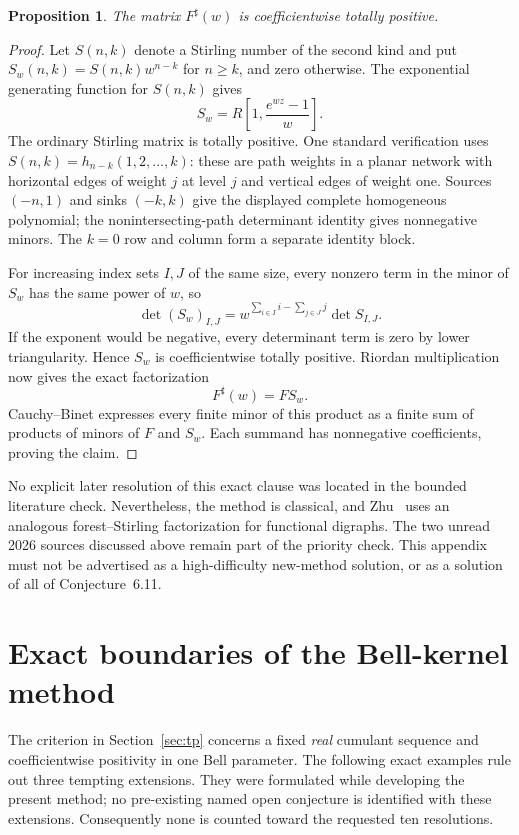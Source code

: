 \documentclass[11pt,a4paper]{article}
\newtheorem{proposition}[theorem]{Proposition}
\theoremstyle{definition}
\theoremstyle{remark}
\numberwithin{equation}{section}
\begin{document}
\begin{proposition}
The matrix $F^{\sharp}(w)$ is coefficientwise totally positive.
\end{proposition}
\begin{proof}
Let $S(n,k)$ denote a Stirling number of the second kind and put
$S_w(n,k)=S(n,k)w^{n-k}$ for $n\ge k$, and zero otherwise.
The exponential generating function for $S(n,k)$ gives
\[
 S_w=R\left[1,\frac{e^{wz}-1}{w}\right].
\]
The ordinary Stirling matrix is totally positive. One standard verification
uses $S(n,k)=h_{n-k}(1,2,\ldots,k)$: these are path weights in a planar
network with horizontal edges of weight $j$ at level $j$ and vertical
edges of weight one. Sources $(-n,1)$ and sinks $(-k,k)$ give the displayed
complete homogeneous polynomial; the nonintersecting-path determinant
identity gives nonnegative minors. The $k=0$ row and column form a separate
identity block.

For increasing index sets $I,J$ of the same size, every nonzero term in
the minor of $S_w$ has the same power of $w$, so
\[
 \det (S_w)_{I,J}
 =w^{\sum_{i\in I}i-\sum_{j\in J}j}\det S_{I,J}.
\]
If the exponent would be negative, every determinant term is zero by
lower triangularity. Hence $S_w$ is coefficientwise totally positive.
Riordan multiplication now gives the exact factorization
\[
 F^{\sharp}(w)=F S_w.
\]
Cauchy--Binet expresses every finite minor of this product as a finite
sum of products of minors of $F$ and $S_w$. Each summand has nonnegative
coefficients, proving the claim.
\end{proof}

No explicit later resolution of this exact clause was located in the
bounded literature check. Nevertheless, the method is classical, and
Zhu~\cite{Zhu2024} uses an analogous forest--Stirling factorization for
functional digraphs. The two unread 2026 sources discussed above remain
part of the priority check. This appendix must not be advertised as a
high-difficulty new-method solution, or as a solution of all of
Conjecture~6.11.

\section{Exact boundaries of the Bell-kernel method}
\label{app:boundaries}

The criterion in Section~\ref{sec:tp} concerns a fixed \emph{real}
cumulant sequence and coefficientwise positivity in one Bell parameter.
The following exact examples rule out three tempting extensions. They
were formulated while developing the present method; no pre-existing
named open conjecture is identified with these extensions. Consequently
none is counted toward the requested ten resolutions.
\end{document}
